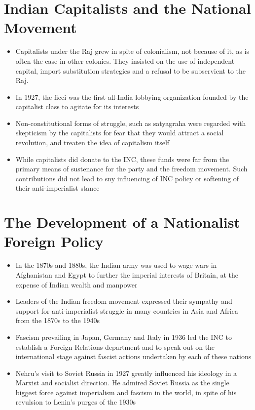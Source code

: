 \section{Indian Capitalists and the National Movement}
\begin{itemize}
    \item Capitalists under the Raj grew in spite of colonialism, not because of it, as is often the case in other colonies. They insisted on the use of independent capital, import substitution strategies and a refusal to be subservient to the Raj.
    \item In 1927, the \acrshort{ficci} was the first all-India lobbying organization founded by the capitalist class to agitate for its interests
    \item Non-constitutional forms of struggle, such as satyagraha were regarded with skepticism by the capitalists for fear that they would attract a social revolution, and treaten the idea of capitalism itself
    \item While capitalists did donate to the INC, these funds were far from the primary means of sustenance for the party and the freedom movement. Such contributions did not lead to sny influencing of INC policy or softening of their anti-imperialist stance
\end{itemize}

\section{The Development of a Nationalist Foreign Policy}
\begin{itemize}
    \item In the 1870s and 1880s, the Indian army was used to wage wars in Afghanistan and Egypt to further the imperial interests of Britain, at the expense of Indian wealth and manpower
    \item Leaders of the Indian freedom movement expressed their sympathy and support for anti-imperialist struggle in many countries in Asia and Africa from the 1870s to the 1940s
    \item Fascism prevailing in Japan, Germany and Italy in 1936 led the INC to establish a Foreign Relations department and to speak out on the international stage against fascist actions undertaken by each of these nations
    \item Nehru's visit to Soviet Russia in 1927 greatly influenced his ideology in a Marxist and socialist direction. He admired Soviet Russia as the single biggest force against imperialism and fascism in the world, in spite of his revulsion to Lenin's purges of the 1930s
\end{itemize}

